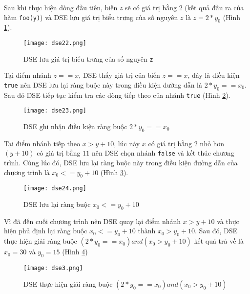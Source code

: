 Sau khi thực hiện dòng đầu tiên, biến $ z $ sẽ có giá trị bằng $ 2 $ (kết quả đầu ra của hàm \texttt{foo(y)}) và DSE lưu giá trị biểu trưng của số nguyên $ z $ là $z = 2*y_{0}$ (Hình \ref{fig:dse22}).

\begin{figure}[H]	
	\begin{center}
		\texttt{[image: dse22.png]}
	\end{center}
	\caption{DSE lưu giá trị biểu trưng của số nguyên \texttt{z}}
	\label{fig:dse22}		
\end{figure}

Tại điểm nhánh $ z == x $, DSE thấy giá trị của biến $ z == x $, đây là điều kiện \texttt{true} nên DSE lưu lại ràng buộc này trong điều kiện đường dẫn là $2*y_{0} == x_{0}$. Sau đó DSE tiếp tục kiểm tra các dòng tiếp theo của nhánh \texttt{true} (Hình \ref{fig:dse23}).

\begin{figure}[H]	
	\begin{center}
		\texttt{[image: dse23.png]}
	\end{center}
	\caption{DSE ghi nhận điều kiện ràng buộc $2*y_{0} == x_{0}$}
	\label{fig:dse23}	
\end{figure}

Tại điểm nhánh tiếp theo $ x > y+10 $, lúc này $ x $ có giá trị bằng $ 2 $ nhỏ hơn $ (y + 10) $ có giá trị bằng $ 11 $ nên DSE chọn nhánh \texttt{false} và kết thúc chương trình. Cùng lúc đó, DSE lưu lại ràng buộc này trong điều kiện đường dẫn của chương trình là $x_{0} <= y_{0} + 10$ (Hình \ref{fig:dse24}).

\begin{figure}[H]	
	\begin{center}
		\texttt{[image: dse24.png]}
	\end{center}
	\caption{DSE lưu lại ràng buộc $x_{0} <= y_{0} + 10$}
	\label{fig:dse24}		
\end{figure}

Vì đã đến cuối chương trình nên DSE quay lại điểm nhánh $ x > y+10 $ và thực hiện phủ định lại ràng buộc $x_{0} <= y_{0} + 10$ thành $ x_{0} > y_{0} + 10 $. Sau đó, DSE thực hiện giải ràng buộc $(2*y_{0} == x_{0}) and (x_{0} > y_{0} + 10)$ kết quả trả về là $x_{0} = 30$ và $y_{0} = 15$ (Hình \ref{fig:dse3})

\begin{figure}[H]	
	\begin{center}
		\texttt{[image: dse3.png]}
	\end{center}
	\caption{DSE thực hiện giải ràng buộc $(2*y_{0} == x_{0}) and (x_{0} > y_{0} + 10)$}
	\label{fig:dse3}
\end{figure}

